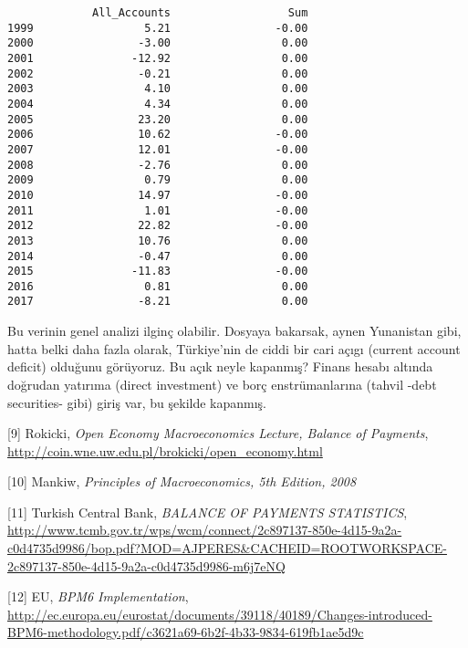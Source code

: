\documentclass[12pt,fleqn]{article}\usepackage{../../common}
\begin{document}
\begin{verbatim}
             All_Accounts                  Sum
1999                 5.21                -0.00
2000                -3.00                 0.00
2001               -12.92                 0.00
2002                -0.21                 0.00
2003                 4.10                 0.00
2004                 4.34                 0.00
2005                23.20                 0.00
2006                10.62                -0.00
2007                12.01                -0.00
2008                -2.76                 0.00
2009                 0.79                 0.00
2010                14.97                -0.00
2011                 1.01                -0.00
2012                22.82                -0.00
2013                10.76                 0.00
2014                -0.47                 0.00
2015               -11.83                -0.00
2016                 0.81                 0.00
2017                -8.21                 0.00
\end{verbatim}

Bu verinin genel analizi ilginç olabilir. Dosyaya bakarsak, aynen
Yunanistan gibi, hatta belki daha fazla olarak, Türkiye'nin de ciddi bir
cari açıgı (current account deficit) olduğunu görüyoruz. Bu açık neyle
kapanmış?  Finans hesabı altında doğrudan yatırıma (direct investment) ve
borç enstrümanlarına (tahvil -debt securities- gibi) giriş var, bu şekilde
kapanmış.

[9] Rokicki, {\em Open Economy Macroeconomics Lecture, Balance of Payments}, 
    \url{http://coin.wne.uw.edu.pl/brokicki/open_economy.html}

[10] Mankiw, {\em Principles of Macroeconomics, 5th Edition, 2008} 

[11] Turkish Central Bank, {\em BALANCE OF PAYMENTS STATISTICS}, 
     \url{http://www.tcmb.gov.tr/wps/wcm/connect/2c897137-850e-4d15-9a2a-c0d4735d9986/bop.pdf?MOD=AJPERES&CACHEID=ROOTWORKSPACE-2c897137-850e-4d15-9a2a-c0d4735d9986-m6j7eNQ}

[12] EU, {\em BPM6 Implementation}, 
     \url{http://ec.europa.eu/eurostat/documents/39118/40189/Changes-introduced-BPM6-methodology.pdf/c3621a69-6b2f-4b33-9834-619fb1ae5d9c}
\end{document}
